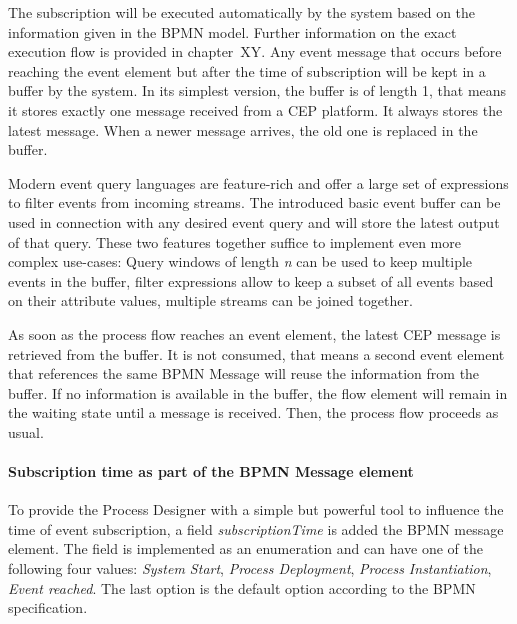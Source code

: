 The subscription will be executed automatically by the system based on the information given in the BPMN model. Further information on the exact execution flow is provided in chapter~XY. 
Any event message that occurs before reaching the event element but after the time of subscription will be kept in a buffer by the system.
In its simplest version, the buffer is of length 1, that means it stores exactly one message received from a CEP platform. It always stores the latest message. When a newer message arrives, the old one is replaced in the buffer.


Modern event query languages are feature-rich and offer a large set of expressions to filter events from incoming streams. 
The introduced basic event buffer can be used in connection with any desired event query and will store the latest output of that query.
These two features together suffice to implement even more complex use-cases: Query windows of length \textit{n} can be used to keep multiple events in the buffer, filter expressions allow to keep a subset of all events based on their attribute values, multiple streams can be joined together.

As soon as the process flow reaches an event element, the latest CEP message is retrieved from the buffer. It is not consumed, that means a second event element that references the same BPMN Message will reuse the information from the buffer.
If no information is available in the buffer, the flow element will remain in the waiting state until a message is received. Then, the process flow proceeds as usual.


\paragraph{Subscription time as part of the BPMN Message element\newline}
To provide the Process Designer with a simple but powerful tool to influence the time of event subscription, a field \textit{subscriptionTime} is added the BPMN message element. 
The field is implemented as an enumeration and can have one of the following four values: \textit{System Start}, \textit{Process Deployment}, \textit{Process Instantiation}, \textit{Event reached}. The last option is the default option according to the BPMN specification.

